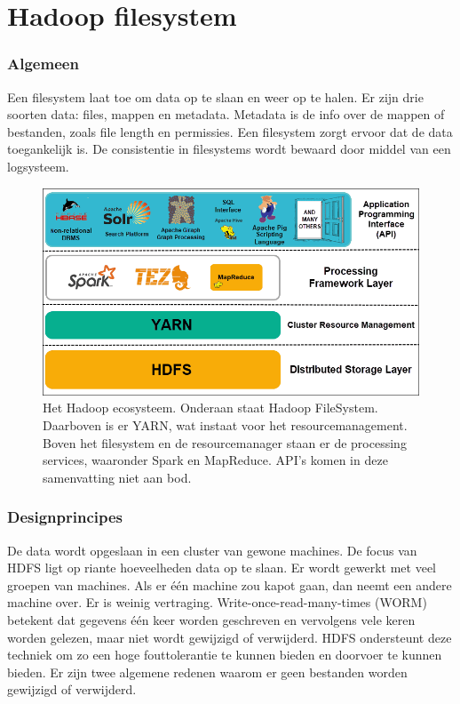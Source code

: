 \documentclass[a4paper,10pt,twoside]{report}
\begin{document}
\section{Hadoop filesystem}

\subsubsection{Algemeen}

Een filesystem laat toe om data op te slaan en weer op te halen. Er zijn drie soorten data: files, mappen en metadata. Metadata is de info over de mappen of bestanden, zoals file length en permissies. Een filesystem zorgt ervoor dat de data toegankelijk is. De consistentie in filesystems wordt bewaard door middel van een logsysteem. 

\begin{figure}
	\includegraphics[width=\linewidth]{images/hadoop-ecosystem-layers.png}
	\caption{Het Hadoop ecosysteem. Onderaan staat Hadoop FileSystem. Daarboven is er YARN, wat instaat voor het resourcemanagement. Boven het filesystem en de resourcemanager staan er de processing services, waaronder Spark en MapReduce. API's komen in deze samenvatting niet aan bod.}
\end{figure}

\subsubsection{Designprincipes}

De data wordt opgeslaan in een cluster van gewone machines. De focus van HDFS ligt op riante hoeveelheden data op te slaan. Er wordt gewerkt met veel groepen van machines. Als er één machine zou kapot gaan, dan neemt een andere machine over. Er is weinig vertraging. Write-once-read-many-times (WORM) betekent dat gegevens één keer worden geschreven en vervolgens vele keren worden gelezen, maar niet wordt gewijzigd of verwijderd. HDFS ondersteunt deze techniek om zo een hoge fouttolerantie te kunnen bieden en doorvoer te kunnen bieden. Er zijn twee algemene redenen waarom er geen bestanden worden gewijzigd of verwijderd.
\end{document}
